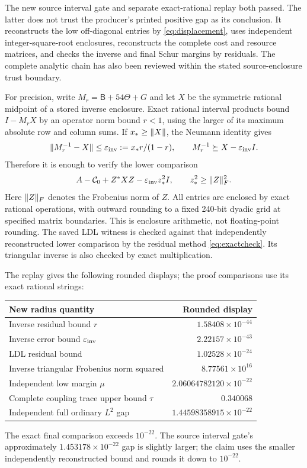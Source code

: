 The new source interval gate and separate exact-rational replay both passed. The latter does not trust the producer's printed positive gap as its conclusion. It reconstructs the low off-diagonal entries by \eqref{eq:displacement}, uses independent integer-square-root enclosures, reconstructs the complete cost and resource matrices, and checks the inverse and final Schur margins by residuals. The complete analytic chain has also been reviewed within the stated source-enclosure trust boundary.

For precision, write $M_r=\mathsf B+54\Theta+G$ and let $X$ be the symmetric rational midpoint of a stored inverse enclosure. Exact rational interval products bound $I-M_rX$ by an operator norm bound $r<1$, using the larger of its maximum absolute row and column sums. If $x_*\ge\lVert X\rVert$, the Neumann identity gives
\[
 \lVert M_r^{-1}-X\rVert\le\varepsilon_{\rm inv}:=x_*r/(1-r),\qquad
 M_r^{-1}\succeq X-\varepsilon_{\rm inv}I.
\]
Therefore it is enough to verify the lower comparison
\[
 A-\mathcal C_0+Z^*XZ-\varepsilon_{\rm inv}z_*^2 I,
 \qquad z_*^2\ge\lVert Z\rVert_F^2.
\]
Here $\lVert Z\rVert_F$ denotes the Frobenius norm of $Z$. All entries are enclosed by exact rational operations, with outward rounding to a fixed 240-bit dyadic grid at specified matrix boundaries. This is enclosure arithmetic, not floating-point rounding. The saved LDL witness is checked against that independently reconstructed lower comparison by the residual method \eqref{eq:exactcheck}. Its triangular inverse is also checked by exact multiplication.

The replay gives the following rounded displays; the proof comparisons use its exact rational strings:
\begin{center}
\begin{tabular}{lr}
\toprule
New radius quantity & Rounded display\\
\midrule
Inverse residual bound $r$ & $1.58408\times10^{-44}$\\
Inverse error bound $\varepsilon_{\rm inv}$ & $2.22157\times10^{-43}$\\
LDL residual bound & $1.02528\times10^{-24}$\\
Inverse triangular Frobenius norm squared & $8.77561\times10^{16}$\\
Independent low margin $\mu$ & $2.06064782120\times10^{-22}$\\
Complete coupling trace upper bound $\tau$ & $0.340068$\\
Independent full ordinary $L^2$ gap & $1.44598358915\times10^{-22}$\\
\bottomrule
\end{tabular}
\end{center}
The exact final comparison exceeds $10^{-22}$. The source interval gate's approximately $1.453178\times10^{-22}$ gap is slightly larger; the claim uses the smaller independently reconstructed bound and rounds it down to $10^{-22}$.
